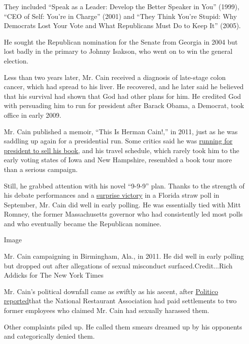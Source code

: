 They included ``Speak as a Leader: Develop the Better Speaker in You''
(1999), ``CEO of Self: You're in Charge'' (2001) and ``They Think You're
Stupid: Why Democrats Lost Your Vote and What Republicans Must Do to
Keep It'' (2005).

He sought the Republican nomination for the Senate from Georgia in 2004
but lost badly in the primary to Johnny Isakson, who went on to win the
general election.

Less than two years later, Mr. Cain received a diagnosis of late-stage
colon cancer, which had spread to his liver. He recovered, and he later
said he believed that his survival had shown that God had other plans
for him. He credited God with persuading him to run for president after
Barack Obama, a Democrat, took office in early 2009.

Mr. Cain published a memoir, ``This Is Herman Cain!,'' in 2011, just as
he was saddling up again for a presidential run. Some critics said he
was
\href{https://www.theatlantic.com/politics/archive/2011/10/herman-cain-skips-out-on-early-states-to-push-his-new-book/246260/}{running
for president to sell his book,} and his travel schedule, which rarely
took him to the early voting states of Iowa and New Hampshire, resembled
a book tour more than a serious campaign.

Still, he grabbed attention with his novel ``9-9-9'' plan. Thanks to the
strength of his debate performances and a
\href{http://thecaucus.blogs.nytimes.com/2011/09/24/herman-cain-wins-florida-straw-poll/}{surprise
victory} in a Florida straw poll in September, Mr. Cain did well in
early polling. He was essentially tied with Mitt Romney, the former
Massachusetts governor who had consistently led most polls and who
eventually became the Republican nominee.

Image

Mr. Cain campaigning in Birmingham, Ala., in 2011. He did well in early
polling but dropped out after allegations of sexual misconduct
surfaced.Credit...Rich Addicks for The New York Times

Mr. Cain's political downfall came as swiftly as his ascent, after
\href{https://www.politico.com/story/2011/10/exclusive-2-women-accused-cain-of-inappropriate-behavior-067194}{Politico
reported}that the National Restaurant Association had paid settlements
to two former employees who claimed Mr. Cain had sexually harassed them.

Other complaints piled up. He called them smears dreamed up by his
opponents and categorically denied them.

